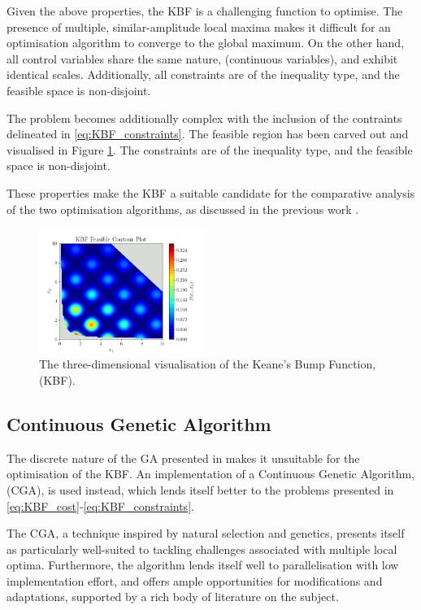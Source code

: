 \documentclass[10pt]{article}
\begin{document}
\begin{multicols}{2}
Given the above properties, the KBF is a challenging function to optimise. The presence of multiple, similar-amplitude local maxima makes it difficult for an optimisation algorithm to converge to the global maximum. On the other hand, all control variables share the same nature, (continuous variables), and exhibit identical scales. Additionally, all constraints are of the inequality type, and the feasible space is non-disjoint.

The problem becomes additionally complex with the inclusion of the contraints delineated in \ref{eq:KBF_constraints}. The feasible region has been carved out and visualised in Figure \ref{fig:KBF_Feasible}. The constraints are of the inequality type, and the feasible space is non-disjoint.

These properties make the KBF a suitable candidate for the comparative analysis of the two optimisation algorithms, as discussed in the previous work \cite{ELBELTAGY1999639}.

\begin{figure}[H]
    \centering
    \includegraphics[width=0.48\textwidth]{../figures/KBF/KBF Feasible_contour.png}
    \captionsetup{justification=centering}
    \caption{The three-dimensional visualisation of the Keane's Bump Function, (KBF).}
    \label{fig:KBF_Feasible}
\end{figure}

\subsection{Continuous Genetic Algorithm}

The discrete nature of the GA presented in \cite{parks2023geneticalgorithms} makes it unsuitable for the optimisation of the KBF. An implementation of a Continuous Genetic Algorithm, (CGA), is used instead, which lends itself better to the problems presented in \ref{eq:KBF_cost}-\ref{eq:KBF_constraints}.

The CGA, a technique inspired by natural selection and genetics, presents itself as particularly well-suited to tackling challenges associated with multiple local optima. Furthermore, the algorithm lends itself well to parallelisation with low implementation effort, and offers ample opportunities for modifications and adaptations, supported by a rich body of literature on the subject.


\end{multicols}
\end{document}
